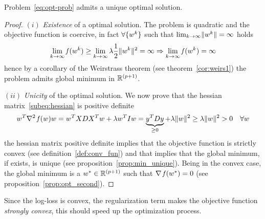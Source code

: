 \begin{prop}
Problem~\eqref{eq:opt-prob} admits a unique optimal solution.
\end{prop}
\begin{proof}
\noindent$(i)$ \emph{Existence} of a optimal solution. The problem is quadratic and the objective function is coercive, in fact $\forall\{w^k\}$ such that $\lim_{k\to\infty}\lVert w^k\rVert=\infty$ holds
\[
\lim_{k\to\infty}\operatorname*{\mathit{f}}(w^k)\geq\lim_{k\to\infty}\lambda\frac{1}{2}\lVert w^k\rVert^2=\infty\Rightarrow\lim_{k\to\infty}\operatorname*{\mathit{f}}(w^k)=\infty
\]
hence by a corollary of the Weirstrass theorem (see theorem~\vref{cor:weirs1}) the problem admits global minimum in $\mathbb{R}^{(p+1)}$.

\noindent$(ii)$ \emph{Unicity} of the optimal solution. We now prove that the hessian matrix~\eqref{subeq:hessian} is positive definite
\[
w^T\nabla^2\operatorname*{\mathit{f}}(w)w=w^TXDX^Tw+\lambda w^TIw=\underbrace{y^TDy}_{\geq0}+\lambda\lVert w\rVert^2\geq\lambda\lVert w\rVert^2>0\quad\forall w
\]
the hessian matrix positive definite implies that the objective function is strictly convex (see definition~\ref{def:conv_fun}) and that implies that the global minimum, if exists, is unique (see proposition~\ref{prop:min_unique}). Being in the convex case, the global minimum is a $w^\ast\in\mathbb{R}^{(p+1)}$ such that $\nabla\operatorname*{\mathit{f}}(w^\ast)=0$ (see proposition~\ref{prop:opt_second}).\qedhere
\end{proof}

\begin{rmk}
Since the log-loss is convex, the regularization term makes the objective function \emph{strongly convex}, this should speed up the optimization process.
\end{rmk}



